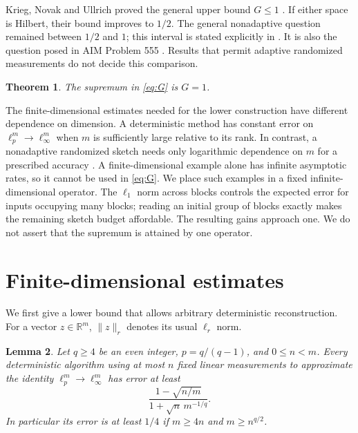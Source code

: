 \documentclass[11pt]{article}
\newtheorem{theorem}{Theorem}
\newtheorem{lemma}[theorem]{Lemma}
\newcommand{\R}{\mathbb R}
\begin{document}
Krieg, Novak and Ullrich proved the general upper bound \(G\le1\)
\cite[Corollaries 14--15]{KNU}. If either space is Hilbert, their bound
improves to \(1/2\). The general nonadaptive question remained between
\(1/2\) and \(1\); this interval is stated explicitly in
\cite[Section 10.2, equation (10.10)]{KU}. It is also the question posed in
AIM Problem 555 \cite{AIM555}. Results that permit adaptive randomized
measurements do not decide this comparison.

\begin{theorem}\label{thm:main}
The supremum in \eqref{eq:G} is \(G=1\).
\end{theorem}

The finite-dimensional estimates needed for the lower construction have
different dependence on dimension. A deterministic method has constant
error on \(\ell_p^m\to\ell_\infty^m\) when \(m\) is sufficiently large
relative to its rank. In contrast, a nonadaptive randomized sketch needs
only logarithmic dependence on \(m\) for a prescribed accuracy
\cite[Proposition 4.1]{KW}. A finite-dimensional example alone has infinite
asymptotic rates, so it cannot be used in \eqref{eq:G}. We place such
examples in a fixed infinite-dimensional operator. The \(\ell_1\) norm
across blocks controls the expected error for inputs occupying many blocks;
reading an initial group of blocks exactly makes the remaining sketch
budget affordable. The resulting gains approach one. We do not assert
that the supremum is attained by one operator.

\section{Finite-dimensional estimates}

We first give a lower bound that allows arbitrary deterministic
reconstruction. For a vector \(z\in\R^m\), \(\|z\|_r\) denotes its usual
\(\ell_r\) norm.

\begin{lemma}\label{lem:det}
Let \(q\ge4\) be an even integer, \(p=q/(q-1)\), and \(0\le n<m\).
Every deterministic algorithm using at most \(n\) fixed linear measurements
to approximate the identity \(\ell_p^m\to\ell_\infty^m\) has error at least
\begin{equation}\label{eq:finite-det}
 \frac{1-\sqrt{n/m}}{1+\sqrt n\,m^{-1/q}}.
\end{equation}
In particular its error is at least \(1/4\) if
\(m\ge4n\) and \(m\ge n^{q/2}\).
\end{lemma}
\end{document}
